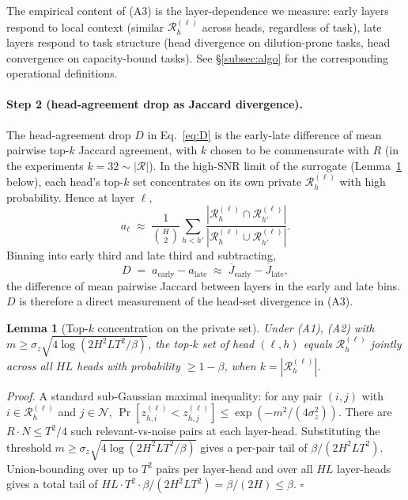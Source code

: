 \documentclass{article}
\newtheorem{lemma}{Lemma}
\begin{document}
The empirical content of (A3) is the layer-dependence we measure: early
layers respond to local context (similar $\mathcal{R}^{(\ell)}_h$ across
heads, regardless of task), late layers respond to task structure (head
divergence on dilution-prone tasks, head convergence on capacity-bound
tasks). See \S\ref{subsec:algo} for the corresponding operational
definitions.

\paragraph{Step 2 (head-agreement drop as Jaccard divergence).}
The head-agreement drop $D$ in Eq.~\eqref{eq:D} is the early-late
difference of mean pairwise top-$k$ Jaccard agreement, with $k$ chosen
to be commensurate with $R$ (in the experiments $k = 32 \sim |\mathcal{R}|$).
In the high-SNR limit of the surrogate (Lemma~\ref{lem:topk} below),
each head's top-$k$ set concentrates on its own private
$\mathcal{R}^{(\ell)}_h$ with high probability. Hence at layer $\ell$,
\begin{equation}
a_\ell \;\approx\; \frac{1}{\binom{H}{2}} \sum_{h < h'}
\frac{|\mathcal{R}^{(\ell)}_h \cap \mathcal{R}^{(\ell)}_{h'}|}
{|\mathcal{R}^{(\ell)}_h \cup \mathcal{R}^{(\ell)}_{h'}|}.
\end{equation}
Binning into early third and late third and subtracting,
\begin{equation}
\label{eq:D-jaccard}
D \;=\; a_{\text{early}} - a_{\text{late}}
\;\approx\;
\overline{J}_{\text{early}} - \overline{J}_{\text{late}},
\end{equation}
the difference of mean pairwise Jaccard between layers in the early and
late bins. $D$ is therefore a direct measurement of the head-set
divergence in (A3).

\begin{lemma}[Top-$k$ concentration on the private set]
\label{lem:topk}
Under (A1), (A2) with $m \geq \sigma_z \sqrt{4 \log(2 H^2 L T^2 / \beta)}$,
the top-$k$ set of head $(\ell, h)$ equals $\mathcal{R}^{(\ell)}_h$
jointly across all $HL$ heads with probability $\geq 1 - \beta$, when
$k = |\mathcal{R}^{(\ell)}_h|$.
\end{lemma}

\emph{Proof.} A standard sub-Gaussian maximal inequality: for any pair
$(i, j)$ with $i \in \mathcal{R}^{(\ell)}_h$ and $j \in \mathcal{N}$,
$\Pr[z_{h, i}^{(\ell)} < z_{h, j}^{(\ell)}] \leq \exp(-m^2 /
(4 \sigma_z^2))$. There are $R \cdot N \leq T^2 / 4$ such relevant-vs-noise
pairs at each layer-head. Substituting the threshold $m \geq
\sigma_z \sqrt{4 \log(2 H^2 L T^2 / \beta)}$ gives a per-pair tail of
$\beta / (2 H^2 L T^2)$. Union-bounding over up to $T^2$ pairs per
layer-head and over all $HL$ layer-heads gives a total tail of $HL \cdot
T^2 \cdot \beta / (2 H^2 L T^2) = \beta / (2 H) \leq \beta$.
\hfill $\square$
\end{document}
